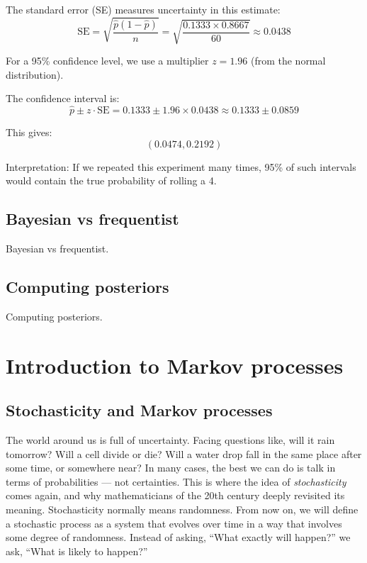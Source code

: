 \documentclass{book}
\begin{document}
The standard error (SE) measures uncertainty in this estimate:
\[
\text{SE} = \sqrt{\frac{\hat{p}(1 - \hat{p})}{n}} = \sqrt{\frac{0.1333 \times 0.8667}{60}} \approx 0.0438
\]

For a 95\% confidence level, we use a multiplier $z=1.96$ (from the normal distribution).

The confidence interval is:
\[
\hat{p} \pm z \cdot \text{SE} = 0.1333 \pm 1.96 \times 0.0438 \approx 0.1333 \pm 0.0859
\]

This gives:
\[
(0.0474, 0.2192)
\]

Interpretation: If we repeated this experiment many times, 95\% of such intervals would contain the true probability of rolling a 4.

\newpage

\section{Bayesian vs frequentist}
Bayesian vs frequentist.

\newpage

\section{Computing posteriors}
Computing posteriors.



\chapter{Introduction to Markov processes}

\section{Stochasticity and Markov processes}

The world around us is full of uncertainty. Facing questions like, will it rain tomorrow? Will a cell divide or die? Will a water drop fall in the same place after some time, or somewhere near? In many cases, the best we can do is talk in terms of probabilities — not certainties. This is where the idea of \textit{stochasticity} comes again, and why mathematicians of the 20th century deeply revisited its meaning. Stochasticity normally means randomness. From now on, we will define a stochastic process as a system that evolves over time in a way that involves some degree of randomness. Instead of asking, “What exactly will happen?” we ask, “What is likely to happen?”\\
\end{document}

